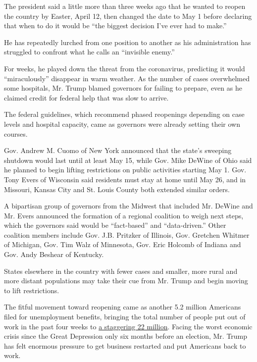 The president said a little more than three weeks ago that he wanted to
reopen the country by Easter, April 12, then changed the date to May 1
before declaring that when to do it would be ``the biggest decision I've
ever had to make.''

He has repeatedly lurched from one position to another as his
administration has struggled to confront what he calls an ``invisible
enemy.''

For weeks, he played down the threat from the coronavirus, predicting it
would ``miraculously'' disappear in warm weather. As the number of cases
overwhelmed some hospitals, Mr. Trump blamed governors for failing to
prepare, even as he claimed credit for federal help that was slow to
arrive.

The federal guidelines, which recommend phased reopenings depending on
case levels and hospital capacity, came as governors were already
setting their own courses.

Gov. Andrew M. Cuomo of New York announced that the state's sweeping
shutdown would last until at least May 15, while Gov. Mike DeWine of
Ohio said he planned to begin lifting restrictions on public activities
starting May 1. Gov. Tony Evers of Wisconsin said residents must stay at
home until May 26, and in Missouri, Kansas City and St. Louis County
both extended similar orders.

A bipartisan group of governors from the Midwest that included Mr.
DeWine and Mr. Evers announced the formation of a regional coalition to
weigh next steps, which the governors said would be ``fact-based'' and
``data-driven.'' Other coalition members include Gov. J.B. Pritzker of
Illinois, Gov. Gretchen Whitmer of Michigan, Gov. Tim Walz of Minnesota,
Gov. Eric Holcomb of Indiana and Gov. Andy Beshear of Kentucky.

States elsewhere in the country with fewer cases and smaller, more rural
and more distant populations may take their cue from Mr. Trump and begin
moving to lift restrictions.

The fitful movement toward reopening came as another 5.2 million
Americans filed for unemployment benefits, bringing the total number of
people put out of work in the past four weeks to
\href{https://www.nytimes3xbfgragh.onion/2020/04/16/business/economy/unemployment-numbers-coronavirus.html}{a
staggering 22 million}. Facing the worst economic crisis since the Great
Depression only six months before an election, Mr. Trump has felt
enormous pressure to get business restarted and put Americans back to
work.

